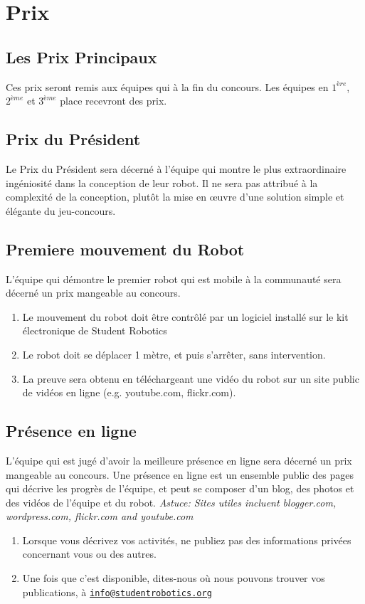 \section {Prix}
\label{sec:Awards}

\subsection{Les Prix Principaux}
Ces prix seront remis aux équipes qui à la fin du concours. Les équipes en $1^{ère}$, $2^{ème}$ et $3^{ème}$ place recevront des prix.

\subsection{Prix du Président}
Le Prix du Président sera décerné à l'équipe qui montre le plus extraordinaire ingéniosité dans la conception de leur robot. Il ne sera pas attribué à la complexité de la conception, plutôt la mise en œuvre d'une solution simple et élégante du jeu-concours.

\subsection{Premiere mouvement du Robot}
L'équipe qui démontre le premier robot qui est mobile à la communauté sera décerné un prix mangeable au concours.
\begin{enumerate}
\item Le mouvement du robot doit être contrôlé par un logiciel installé sur le kit électronique de Student Robotics
\item Le robot doit se déplacer 1 mètre, et puis s'arrêter, sans intervention.
\item La preuve sera obtenu en téléchargeant une vidéo du robot sur un site public de vidéos en ligne (e.g. youtube.com, flickr.com).
\end{enumerate}


\subsection{Présence en ligne}
L'équipe qui est jugé d'avoir la meilleure présence en ligne sera décerné un prix mangeable au concours. Une présence en ligne est un ensemble public des pages qui décrive les progrès de l'équipe, et peut se composer d'un blog, des photos et des vidéos de l'équipe et du robot.  \emph{Astuce: Sites utiles incluent blogger.com, wordpress.com, flickr.com and youtube.com}
\begin{enumerate}
\item Lorsque vous décrivez vos activités, ne publiez pas des informations privées concernant vous ou des autres.
\item Une fois que c'est disponible, dites-nous où nous pouvons trouver vos publications, à \linebreak\href{mailto:info@studentrobotics.org}{\nolinkurl{info@studentrobotics.org}}
\end{enumerate}
